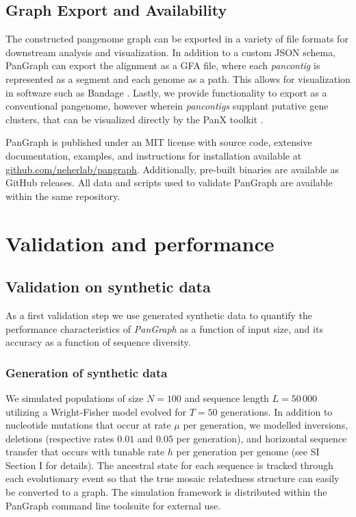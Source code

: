 \documentclass[aps,rmp,reprint,superscriptaddress,notitlepage,10pt]{revtex4-1}
\begin{document}
\subsection{Graph Export and Availability}
The constructed pangenome graph can be exported in a variety of file formats for downstream analysis and visualization.
In addition to a custom JSON schema, PanGraph can export the alignment as a GFA file, where each \emph{pancontig} is represented as a segment and each genome as a path.
This allows for visualization in software such as Bandage \cite{wick2015bandage}.
Lastly, we provide functionality to export as a conventional pangenome, however wherein \emph{pancontigs} supplant putative gene clusters, that can be visualized directly by the PanX toolkit \cite{ding2018panx}.

PanGraph is published under an MIT license with source code, extensive documentation, examples, and instructions for installation available at \url{github.com/neherlab/pangraph}.
Additionally, pre-built binaries are available as GitHub releases.
All data and scripts used to validate PanGraph are available within the same repository.

\section{Validation and performance}

\subsection{Validation on synthetic data}

As a first validation step we use generated synthetic data to quantify the performance characteristics of \textit{PanGraph} as a function of input size, and its accuracy as a function of sequence diversity.

\subsubsection*{Generation of synthetic data}

We simulated populations of size $N=100$ and sequence length $L=50\,000$ utilizing a Wright-Fisher model \cite{hudson2002generating} evolved for $T=50$ generations.
In addition to nucleotide mutations that occur at rate $\mu$ per generation, we modelled inversions, deletions (respective rates $0.01$ and $0.05$ per generation), and horizontal sequence transfer that occurs with tunable rate $h$ per generation per genome (see SI Section I for details).
The ancestral state for each sequence is tracked through each evolutionary event so that the true mosaic relatedness structure can easily be converted to a graph.
The simulation framework is distributed within the PanGraph command line toolsuite for external use.
\end{document}

